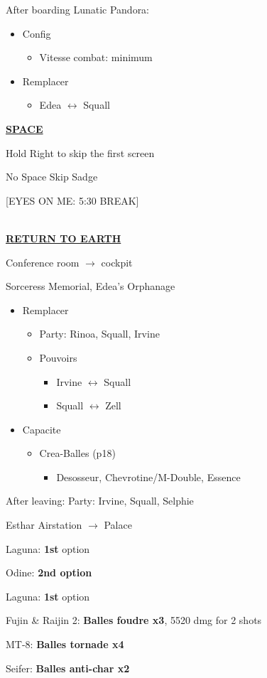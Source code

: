 After boarding Lunatic Pandora:
\begin{menu}
	\begin{itemize}
		\item Config
			\begin{itemize}
				\item Vitesse combat: minimum
			\end{itemize}
		\item Remplacer
			\begin{itemize}
				\item Edea $\leftrightarrow$ Squall
			\end{itemize}
	\end{itemize}
\end{menu}

\underline{\textbf{SPACE}}

Hold Right to skip the first screen

No Space Skip Sadge

[EYES ON ME: 5:30 BREAK]


\leavevmode\\
\underline{\textbf{RETURN TO EARTH}}

Conference room $\rightarrow$ cockpit

Sorceress Memorial, Edea's Orphanage

\begin{menu}
	\begin{itemize}
		\item Remplacer
			\begin{itemize}
				\item Party: Rinoa, Squall, Irvine
				\item Pouvoirs
					\begin{itemize}
						\item Irvine $\leftrightarrow$ Squall
						\item Squall $\leftrightarrow$ Zell
					\end{itemize}
			\end{itemize}
		\item Capacite
			\begin{itemize}
				\item Crea-Balles (p18)
					\begin{itemize}
						\item Desosseur, Chevrotine/M-Double, Essence
					\end{itemize}
			\end{itemize}
		\end{itemize}
\end{menu}

After leaving:
Party: Irvine, Squall, Selphie

Esthar Airstation $\rightarrow$ Palace

Laguna: \textbf{1st} option

Odine: \textbf{2nd option}

Laguna: \textbf{1st} option

Fujin \& Raijin 2: \textbf{Balles foudre x3}, 5520 dmg for 2 shots

MT-8: \textbf{Balles tornade x4}

Seifer: \textbf{Balles anti-char x2}
\leavevmode\\
